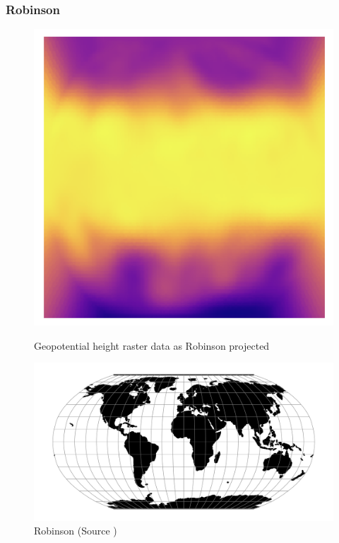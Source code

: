 \subsubsection*{Robinson}
\begin{figure}[h]
    \centering
    \begin{minipage}{0.30\textwidth}
        \centering
        \includegraphics[width=0.9\linewidth]{figures/chapter-8/geopoth_robin.png}
        \caption{ Geopotential height raster data as Robinson projected}
        \label{fig:robin_geopoth_raster}
    \end{minipage}\hfill
    \begin{minipage}{0.30\textwidth}
        \centering
        \includegraphics[width=0.9\linewidth]{figures/chapter-8/robin.png}
        \caption{Robinson (Source \cite{PROJ_SITE})}
        \label{fig:robin_proj}
    \end{minipage}\hfill

\end{figure}
